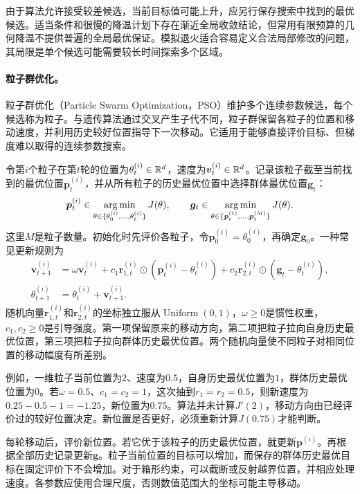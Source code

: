 由于算法允许接受较差候选，当前目标值可能上升，应另行保存搜索中找到的最优候选。适当条件和很慢的降温计划下存在渐近全局收敛结论，但常用有限预算的几何降温不提供普遍的全局最优保证。模拟退火适合容易定义合法局部修改的问题，其局限是单个候选可能需要较长时间探索多个区域。

\paragraph{粒子群优化。}
粒子群优化（Particle Swarm Optimization，PSO）维护多个连续参数候选，每个候选称为粒子。与遗传算法通过交叉产生子代不同，粒子群保留各粒子的位置和移动速度，并利用历史较好位置指导下一次移动。它适用于能够直接评价目标、但梯度难以取得的连续参数搜索。

令第$i$个粒子在第$t$轮的位置为$\theta_t^{(i)}\in\mathbb{R}^d$，速度为$\bm v_t^{(i)}\in\mathbb{R}^d$。记录该粒子截至当前找到的最优位置$\bm p_t^{(i)}$，并从所有粒子的历史最优位置中选择群体最优位置$\bm g_t$：
\begin{equation}
 \bm p_t^{(i)}\in\mathop{\mathrm{arg\,min}}_{\theta\in\{\theta_0^{(i)},\ldots,\theta_t^{(i)}\}}J(\theta),\qquad
 \bm g_t\in\mathop{\mathrm{arg\,min}}_{\theta\in\{\bm p_t^{(1)},\ldots,\bm p_t^{(M)}\}}J(\theta).
\end{equation}
这里$M$是粒子数量。初始化时先评价各粒子，令$\bm p_0^{(i)}=\theta_0^{(i)}$，再确定$\bm g_0$。一种常见更新规则为
\begin{align}
 \bm v_{t+1}^{(i)}
 &=\omega\bm v_t^{(i)}
 +c_1\bm r_{1,t}^{(i)}\odot(\bm p_t^{(i)}-\theta_t^{(i)})
 +c_2\bm r_{2,t}^{(i)}\odot(\bm g_t-\theta_t^{(i)}),\\
 \theta_{t+1}^{(i)}&=\theta_t^{(i)}+\bm v_{t+1}^{(i)}.
 \label{eq:solving-pso-update}
\end{align}
随机向量$\bm r_{1,t}^{(i)}$和$\bm r_{2,t}^{(i)}$的坐标独立服从$\operatorname{Uniform}(0,1)$，$\omega\geq0$是惯性权重，$c_1,c_2\geq0$是引导强度。第一项保留原来的移动方向，第二项把粒子拉向自身历史最优位置，第三项把粒子拉向群体历史最优位置。两个随机向量使不同粒子对相同位置的移动幅度有所差别。

例如，一维粒子当前位置为$2$、速度为$0.5$，自身历史最优位置为$1$，群体历史最优位置为$0$。若$\omega=0.5$、$c_1=c_2=1$，这次抽到$r_1=r_2=0.5$，则新速度为$0.25-0.5-1=-1.25$，新位置为$0.75$。算法并未计算$J'(2)$，移动方向由已经评价过的较好位置决定。新位置是否更好，必须重新计算$J(0.75)$才能判断。

每轮移动后，评价新位置。若它优于该粒子的历史最优位置，就更新$\bm p^{(i)}$。再根据全部历史记录更新$\bm g$。粒子当前位置的目标可以增加，而保存的群体历史最优目标在固定评价下不会增加。对于箱形约束，可以截断或反射越界位置，并相应处理速度。各参数应使用合理尺度，否则数值范围大的坐标可能主导移动。

